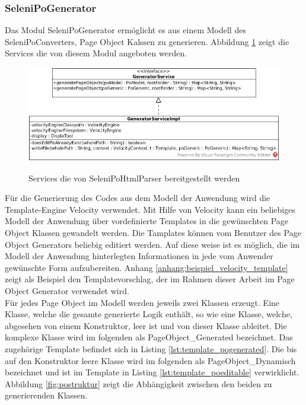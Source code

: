 \subsubsection{SeleniPoGenerator}
\label{sec:selenipogenerator}
Das Modul SeleniPoGenerator ermöglicht es aus einem Modell des SeleniPoConverters, Page Object Kalssen zu generieren.
Abbildung \ref{fig:generator_service} zeigt die Services die von diesem Modul angeboten werden.

\begin{figure}[htb]
  \centering  
  \includegraphics[scale=0.5]{img/SelenipoGenerator.jpg}\\
  \caption{Services die von SeleniPoHtmlParser bereitgestellt werden}
  \label{fig:generator_service}
\end{figure}

Für die Generierung des Codes aus dem Modell der Anwendung wird die Template-Engine Velocity \cite{apache_software_foundation_apache_2015} verwendet.
Mit Hilfe von Velocity kann ein beliebiges Modell der Anwendung über vordefinierte Templates in die gewünschten Page Object Klassen gewandelt werden.
Die Tamplates können vom Benutzer des Page Object Generators beliebig editiert werden. Auf diese weise ist es möglich, die im Modell der Anwendung hinterlegten Informationen in jede vom Anwender gewünschte Form aufzubereiten. Anhang \ref{anhang:beispiel_velocity_template} zeigt als Beispiel den Templatevorschlag, der im Rahmen dieser Arbeit im Page Object Generator verwendet wird.\\
Für jedes Page Object im Modell werden jeweils zwei Klassen erzeugt. Eine Klasse, welche die gesamte generierte Logik enthält, so wie eine Klasse, welche, abgesehen von einem Konstruktor, leer ist und von dieser Klasse ableitet. 
Die komplexe Klasse wird im folgenden als PageObject\_Generated bezeichnet. Das zugehörige Template befindet sich in Listing \ref{lst:template_pogenerated}. Die
bis auf den Konstruktor leere Klasse wird im folgenden als PageObject\_Dynamisch bezeichnet und ist im Template in Listing \ref{lst:template_poeditable} verwirklicht.
Abbildung \ref{fig:postruktur} zeigt die Abhängigkeit zwischen den beiden zu generierenden Klassen.

